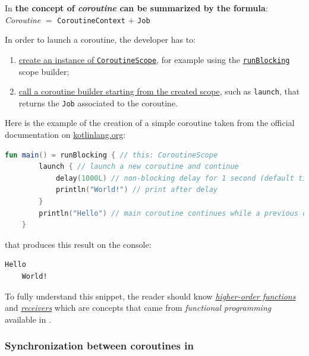 \begin{center}
	In \Kotlin \textbf{the concept of \textit{coroutine} can be summarized by the formula}:\\
		\textit{Coroutine} $=$ \texttt{CoroutineContext} $+$ \texttt{Job}
\end{center}

In order to launch a coroutine, the developer has to:
\begin{enumerate}
	\item \underline{create an instance of \texttt{CoroutineScope}}, for example using the \href{https://kotlinlang.org/api/kotlinx.coroutines/kotlinx-coroutines-core/kotlinx.coroutines/run-blocking.html}{\texttt{runBlocking}} scope builder;
	
	\item \underline{call a coroutine builder starting from the created scope}, such as \texttt{launch}, that returns the \texttt{Job} associated to the coroutine.
\end{enumerate}

Here is the example of the creation of a simple coroutine taken from the official documentation on \href{https://kotlinlang.org/docs/coroutines-basics.html#your-first-coroutine}{kotlinlang.org}:
\begin{lstlisting}[language=kotlin]
	fun main() = runBlocking { // this: CoroutineScope
		launch { // launch a new coroutine and continue
			delay(1000L) // non-blocking delay for 1 second (default time unit is ms)
			println("World!") // print after delay
		}
		println("Hello") // main coroutine continues while a previous one is delayed
	}
\end{lstlisting}

that produces this result on the console:
\begin{lstlisting}[numbers=none]
	Hello
	World!
\end{lstlisting}

To fully understand this snippet, the reader should know \href{https://kotlinlang.org/docs/lambdas.html#higher-order-functions}{\textit{higher-order functions}} and \href{https://kotlinlang.org/docs/lambdas.html#function-types}{\textit{receivers}} which are concepts that came from \textit{functional programming} available in \Kotlin.

\subsubsection{Synchronization between coroutines in \Kotlin}

